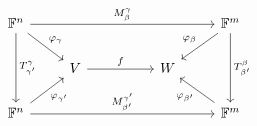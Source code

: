 \[
    \begin{tikzcd}
        \field^n \arrow[dd, "T_{\gamma'}^{\gamma}"] \arrow[rrrr, "M_{\beta}^{\gamma}"] \arrow[rd, "\varphi_\gamma"] &                   &  &   & \field^m \arrow[dd, "T_{\beta'}^{\beta}"] \arrow[ld, "\varphi_\beta"'] \\
        & V \arrow[rr, "f"] &  & W &                                                       \\
        \field^n \arrow[rrrr, "M_{\beta'}^{\gamma'}"] \arrow[ru, "\varphi_{\gamma'}"']                    &                   &  &   & \field^m \arrow[lu, "\varphi_{\beta'}"]
    \end{tikzcd}
\]


